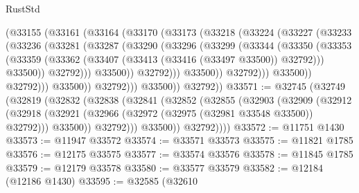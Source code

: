 \begin{lexlean}{RustStd}
\begin{coremodule}
                        (@33155
                          (@33161
                            (@33164
                              (@33170
                                (@33173
                                  (@33218
                                    (@33224
                                      (@33227
                                        (@33233
                                          (@33236
                                            (@33281
                                              (@33287
                                                (@33290
                                                  (@33296
                                                    (@33299
                                                      (@33344
                                                        (@33350
                                                          (@33353
                                                            (@33359
                                                              (@33362
                                                                (@33407
                                                                  (@33413
                                                                    (@33416 (@33497 @33500))
                                                                    @32792)))
                                                              @33500))
                                                          @32792)))
                                                    @33500))
                                                @32792)))
                                          @33500))
                                      @32792)))
                                @33500))
                            @32792)))
                      @33500))
                  @32792)))
            @33500))
        @32792))
@33571 := @32745
    (@32749
      (@32819
        (@32832
          (@32838
            (@32841
              (@32852
                (@32855
                  (@32903
                    (@32909
                      (@32912
                        (@32918
                          (@32921 (@32966 (@32972 (@32975 (@32981 @33548 @33500)) @32792)))
                          @33500))
                      @32792)))
                @33500))
            @32792))))
@33572 := @11751 @1430
@33573 := @11947 @33572
@33574 := @33571 @33573
@33575 := @11821 @1785
@33576 := @12175 @33575
@33577 := @33574 @33576
@33578 := @11845 @1785
@33579 := @12179 @33578
@33580 := @33577 @33579
@33582 := @12184 (@12186 @1430)
@33595 := @32585
    (@32610

\end{coremodule}
\end{lexlean}

